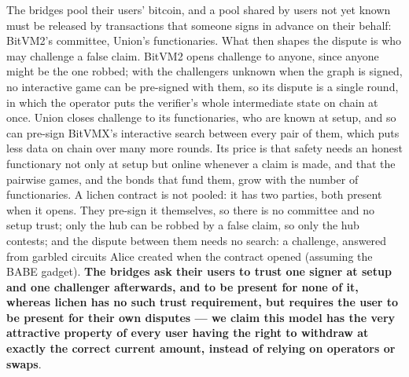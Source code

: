 \documentclass[11pt]{article}
\begin{document}
The bridges pool their users' bitcoin, and a pool shared by users not
yet known must be released by transactions that someone signs in
advance on their behalf: BitVM2's committee, Union's functionaries.
What then shapes the dispute is who may challenge a false claim. BitVM2
opens challenge to anyone, since anyone might be the one robbed; with
the challengers unknown when the graph is signed, no interactive game
can be pre-signed with them, so its dispute is a single round, in which
the operator puts the verifier's whole intermediate state on chain at
once. Union closes challenge to its functionaries, who are known at
setup, and so can pre-sign BitVMX's interactive search between every
pair of them, which puts less data on chain over many more rounds. Its
price is that safety needs an honest functionary not only at setup but
online whenever a claim is made, and that the pairwise games, and the
bonds that fund them, grow with the number of functionaries. A lichen
contract is not pooled: it has two parties, both present when it opens.
They pre-sign it themselves, so there is no committee and no setup
trust; only the hub can be robbed by a false claim, so only the hub
contests; and the dispute between them needs no search: a challenge,
answered from garbled circuits Alice created when the contract opened
(assuming the BABE gadget). \textbf{The bridges ask their users
to trust one signer at setup and one challenger afterwards, and to be
present for none of it, whereas lichen has no such trust requirement, but requires the user to be present for their own disputes --- we claim this model has the very attractive property of every user having the right to withdraw at exactly the correct current amount, instead of relying on operators or swaps}.
\end{document}
